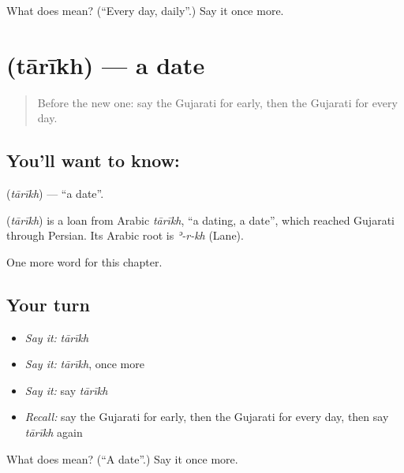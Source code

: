 \begin{tcolorbox}[breakable,colback=teal!4,colframe=teal!35!black,title={Before you move on}]
What does  mean? (\textquotedblleft{}Every day, daily\textquotedblright{}.) Say it once more.
\end{tcolorbox}
\section[\texorpdfstring{\gu{તારીખ} (tārīkh)}{તારીખ (tārīkh)}]{ (tārīkh) — a date}

\label{lesson:GU-C94-tarikh}



\begin{quote}
Before the new one: say the Gujarati for early, then the Gujarati for every day.
\end{quote}

\subsection*{You'll want to know: }
\textbf{} (\emph{tārīkh}) — \textquotedblleft{}a date\textquotedblright{}.

\begin{cousinweb}
\textbf{} (\emph{tārīkh}) is a loan from Arabic \emph{tārīkh}, \textquotedblleft{}a dating, a date\textquotedblright{}, which reached Gujarati through Persian. Its Arabic root is \emph{ʾ-r-kh} (Lane).
\end{cousinweb}

\begin{grammarlens}[title={What you've built}]
One more word for this chapter.
\end{grammarlens}

\subsection*{Your turn}
\begin{itemize}
\raggedright
  \item \emph{Say it:} \emph{tārīkh}
  \item \emph{Say it:} \emph{tārīkh}, once more
  \item \emph{Say it:} say \emph{tārīkh}
  \item \emph{Recall:} say the Gujarati for early, then the Gujarati for every day, then say \emph{tārīkh} again
\end{itemize}

\begin{tcolorbox}[breakable,colback=teal!4,colframe=teal!35!black,title={Before you move on}]
What does  mean? (\textquotedblleft{}A date\textquotedblright{}.) Say it once more.
\end{tcolorbox}
